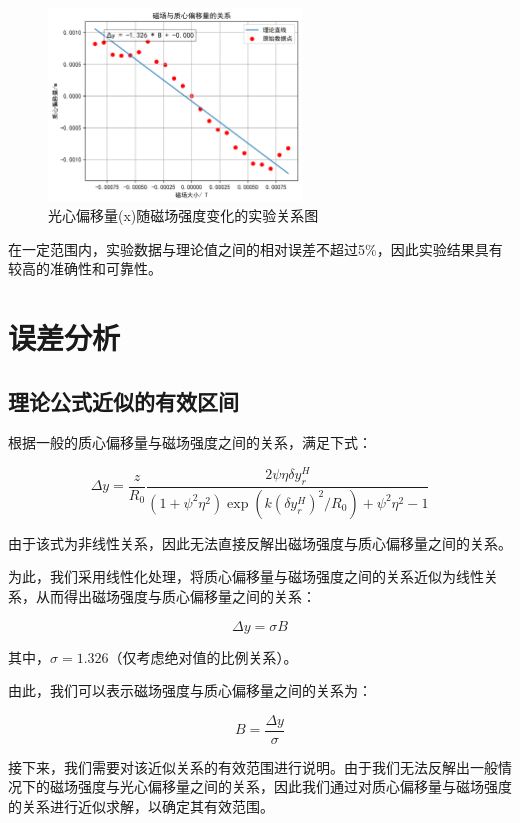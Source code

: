 \documentclass[12pt]{ctexart}
\numberwithin{equation}{section} %
\begin{document}
\begin{figure}[H] %
    \centering %
    \includegraphics[width=0.6\textwidth]{磁场与质心偏移量的关系.png} %
    \caption{光心偏移量(x)随磁场强度变化的实验关系图} %
    \label{fig:有效区间} %
\end{figure}
在一定范围内，实验数据与理论值之间的相对误差不超过5\%，因此实验结果具有较高的准确性和可靠性。

\section{误差分析}
\subsection{理论公式近似的有效区间}

根据一般的质心偏移量与磁场强度之间的关系，满足下式：

\[
\Delta y = \frac{z}{R_0} \frac{2\psi\eta \delta y_{r}^{H}}{(1+\psi^2 \eta^2) \exp\left(k(\delta y_{r}^{H})^2/R_0\right) + \psi^2 \eta^2 - 1}
\]

由于该式为非线性关系，因此无法直接反解出磁场强度与质心偏移量之间的关系。

为此，我们采用线性化处理，将质心偏移量与磁场强度之间的关系近似为线性关系，从而得出磁场强度与质心偏移量之间的关系：

\[
\Delta y = \sigma B
\]

其中，\(\sigma = 1.326\)（仅考虑绝对值的比例关系）。

由此，我们可以表示磁场强度与质心偏移量之间的关系为：

\[
B = \frac{\Delta y}{\sigma}
\]

接下来，我们需要对该近似关系的有效范围进行说明。由于我们无法反解出一般情况下的磁场强度与光心偏移量之间的关系，因此我们通过对质心偏移量与磁场强度的关系进行近似求解，以确定其有效范围。
\end{document}
